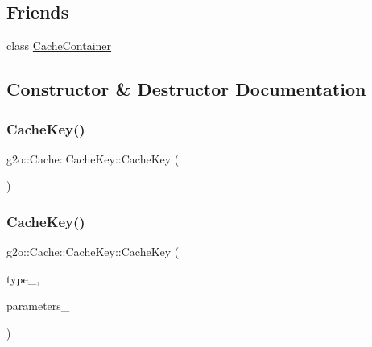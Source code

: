 \subsection*{Friends}
\begin{DoxyCompactItemize}
\item 
class \mbox{\hyperlink{classg2o_1_1_cache_1_1_cache_key_a86dec1e0424aa4ae4e6867c69efd7868}{Cache\+Container}}
\end{DoxyCompactItemize}


\subsection{Constructor \& Destructor Documentation}
\mbox{\label{classg2o_1_1_cache_1_1_cache_key_a44405e660e962a9d39cfaf97f103b139}} 
\subsubsection{\texorpdfstring{Cache\+Key()}{CacheKey()}\hspace{0.1cm}{\footnotesize\ttfamily [1/2]}}
{\footnotesize\ttfamily g2o\+::\+Cache\+::\+Cache\+Key\+::\+Cache\+Key (\begin{DoxyParamCaption}{ }\end{DoxyParamCaption})}

\mbox{\label{classg2o_1_1_cache_1_1_cache_key_a363ba06fe3b3f17acd664b0706ba3270}} 
\subsubsection{\texorpdfstring{Cache\+Key()}{CacheKey()}\hspace{0.1cm}{\footnotesize\ttfamily [2/2]}}
{\footnotesize\ttfamily g2o\+::\+Cache\+::\+Cache\+Key\+::\+Cache\+Key (\begin{DoxyParamCaption}\item[{const std\+::string \&}]{type\+\_\+,  }\item[{const \mbox{\hyperlink{namespaceg2o_a85cc8f2c7db8cab47b2b269a7acd6785}{Parameter\+Vector}} \&}]{parameters\+\_\+ }\end{DoxyParamCaption})}




